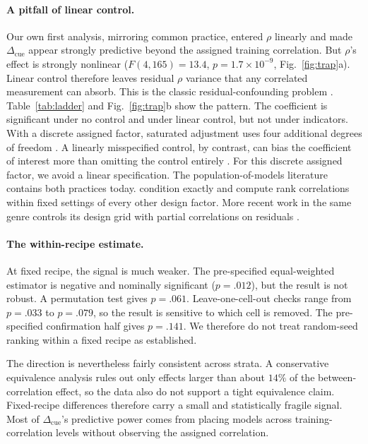 \documentclass[11pt]{article}
\newcommand{\cued}{\ensuremath{\Delta_{\mathrm{cue}}}}
\begin{document}
\paragraph{A pitfall of linear control.}
Our own first analysis, mirroring common practice, entered $\rho$ linearly and
made \cued{} appear strongly predictive beyond the assigned training
correlation. But $\rho$'s
effect is strongly nonlinear
($F(4,165){=}13.4$, $p{=}1.7{\times}10^{-9}$, Fig.~\ref{fig:trap}a). Linear control therefore leaves residual $\rho$ variance that any correlated measurement can absorb. This is the classic residual-confounding problem \citep{groenwold2013adjustment}. Table~\ref{tab:ladder} and Fig.~\ref{fig:trap}b show the pattern. The coefficient is significant under no control and under
linear control, but not under indicators.
With a discrete assigned factor, saturated adjustment uses four additional
degrees of freedom \citep{lin2013agnostic}. A linearly misspecified control, by
contrast, can bias the coefficient of interest more than omitting the control
entirely \citep{goff2014linear}. For this discrete assigned factor, we avoid a linear specification. The population-of-models literature contains both practices today.
\citet{jiang2020fantastic} condition exactly and compute rank correlations
within fixed settings of every other design factor. More recent work in the
same genre controls its design grid with partial correlations on residuals
\citep{tan2024fractal}. 


\paragraph{The within-recipe estimate.}
At fixed recipe, the signal is much weaker. The pre-specified equal-weighted
estimator is negative and nominally significant ($p{=}.012$), but the result is
not robust. A permutation test gives $p{=}.061$. Leave-one-cell-out checks range from
$p{=}.033$ to $p{=}.079$, so the result is sensitive to which cell is removed.
The pre-specified confirmation half gives $p{=}.141$. We therefore do not treat
random-seed ranking within a fixed recipe as established.

The direction is nevertheless fairly consistent across strata. A conservative
equivalence analysis rules out only effects larger than about $14\%$ of the
between-correlation effect, so the data also do not support a tight equivalence
claim. Fixed-recipe differences therefore carry a small and statistically fragile signal. Most of \cued{}'s predictive power comes from placing models
across training-correlation levels without observing the assigned correlation.
\end{document}
